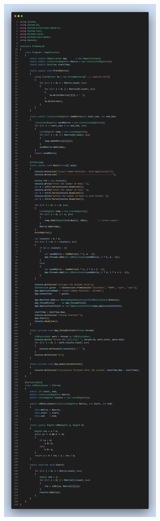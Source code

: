 \documentclass[12pt,a4paper]{report}
\begin{document}
\begin{center}
\includegraphics[trim=0in 0in 0in 60.3in, clip, scale=.23]{./Figures/Problem_02/Problem_02}
\clearpage
\end{center}
\end{document}
